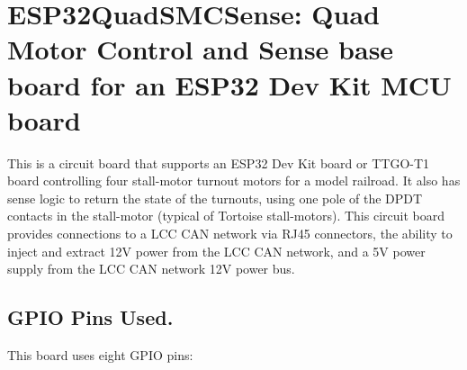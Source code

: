 %
%
%
%
% 
%
%
%
%
%
% 
%

\chapter{ESP32QuadSMCSense: Quad Motor Control and Sense base board for an ESP32 Dev Kit MCU board}

This is a circuit board that supports an ESP32 Dev Kit board or TTGO-T1 board
controlling four stall-motor turnout motors for a model railroad. It also has
sense logic to return the state of the turnouts, using one pole of the DPDT
contacts in the stall-motor (typical of Tortoise stall-motors). This circuit
board provides connections to a LCC CAN network via RJ45 connectors, the
ability to inject and extract 12V power from the LCC CAN network, and a 5V
power supply from the LCC CAN network 12V power bus.

\section{GPIO Pins Used.}

This board uses eight GPIO pins:

